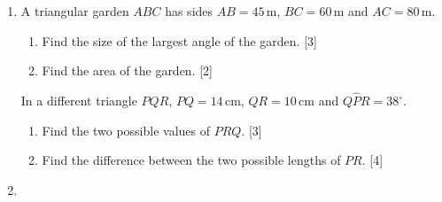 \documentclass[12pt, twoside]{article}
\begin{document}
\begin{enumerate}[itemsep=0.15cm]
\item[2.] [Maximum mark: 12]

A triangular garden $ABC$ has sides $AB = 45\,\text{m}$,
$BC = 60\,\text{m}$ and $AC = 80\,\text{m}$.

\begin{center}
\end{center}

\begin{enumerate}[itemsep=0.1cm]
  \item Find the size of the largest angle of the garden. \hfill [3]
  \item Find the area of the garden. \hfill [2]
\end{enumerate}

In a different triangle $PQR$, $PQ = 14\,\text{cm}$, $QR = 10\,\text{cm}$
and $Q\hat{P}R = 38^\circ$.

\begin{enumerate}[itemsep=0.1cm]
  \item[(c)] Find the two possible values of $P\hat{R}Q$. \hfill [3]
  \item[(d)] Find the difference between the two possible lengths of
  $PR$. \hfill [4]
\end{enumerate}


\newpage

\item[3.] [Maximum mark: 9]


\end{enumerate}
\end{document}
